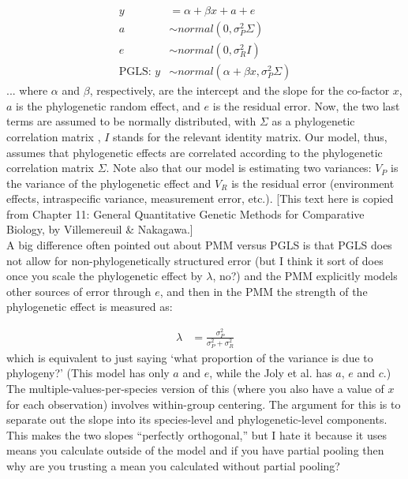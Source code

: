 \documentclass[11pt,letter]{article}
\begin{document}
\begin{align}
y & = \alpha + \beta x + a + e\\
a & \sim normal(0, \sigma_P^2\Sigma)\\
e & \sim normal(0, \sigma_R^2I)\\
\text{PGLS: }y & \sim normal(\alpha + \beta x, \sigma_P^2\Sigma)
\end{align}
... where $\alpha$ and $\beta$, respectively, are the intercept and the slope for the co-factor $x$, $a$ is the phylogenetic random effect, and $e$ is the residual error. Now, the two last terms are assumed to be normally distributed, with $\Sigma$ as a phylogenetic correlation matrix , $I$ stands for the relevant identity matrix. Our model, thus, assumes that phylogenetic effects are correlated according to the phylogenetic correlation matrix $\Sigma$. Note also that our model is estimating two variances: $V_P$ is the variance of the phylogenetic effect and $V_R$ is the residual error (environment effects, intraspecific variance, measurement error, etc.). [This text here is copied from Chapter 11: General Quantitative Genetic Methods for Comparative Biology, by Villemereuil \& Nakagawa.]\\

A big difference often pointed out about PMM versus PGLS is that PGLS does not allow for non-phylogenetically structured error (but I think it sort of does once you scale the phylogenetic effect by $\lambda$, no?) and the PMM explicitly models other sources of error through $e$, and then in the PMM the strength of the phylogenetic effect is measured as:

\begin{align}
\lambda & = \frac{\sigma^2_P}{\sigma^2_P+\sigma^2_R}
\end{align}
which is equivalent to just saying `what proportion of the variance is due to phylogeny?' (This model has only $a$ and $e$, while the Joly et al. has $a$, $e$ and $c$.)\\

The multiple-values-per-species version of this (where you also have a value of $x$ for each observation) involves within-group centering. The argument for this is to separate out the slope into its species-level and phylogenetic-level components. This makes the two slopes ``perfectly orthogonal,'' but I hate it because it uses means you calculate outside of the model and if you have partial pooling then why are you trusting a mean you calculated without partial pooling? \\
\end{document}
